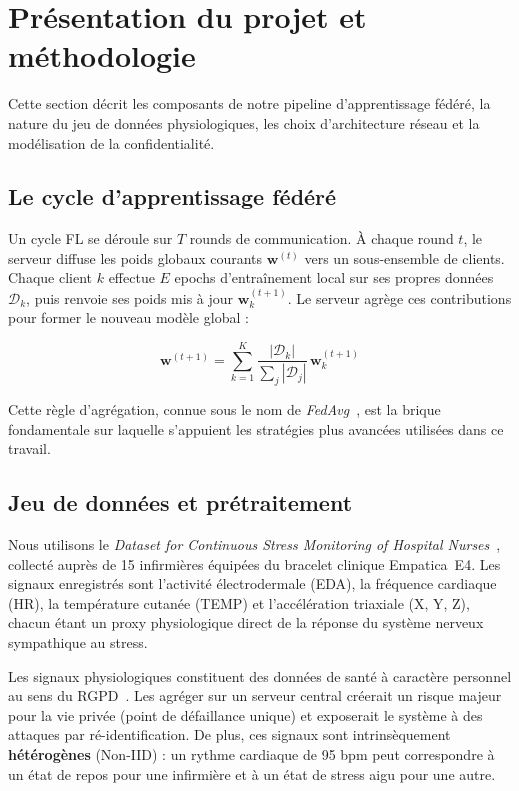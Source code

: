 \documentclass{article}
\begin{document}
\section{Présentation du projet et méthodologie}
\label{sec:methodology}

Cette section décrit les composants de notre pipeline d'apprentissage fédéré, la nature
du jeu de données physiologiques, les choix d'architecture réseau et la modélisation
de la confidentialité.

\subsection{Le cycle d'apprentissage fédéré}
\label{subsec:fl_cycle}

Un cycle FL se déroule sur $T$ rounds de communication. À chaque round $t$, le serveur
diffuse les poids globaux courants $\mathbf{w}^{(t)}$ vers un sous-ensemble de clients.
Chaque client $k$ effectue $E$ epochs d'entraînement local sur ses propres données
$\mathcal{D}_k$, puis renvoie ses poids mis à jour $\mathbf{w}_k^{(t+1)}$. Le serveur
agrège ces contributions pour former le nouveau modèle global :

\begin{equation}
  \mathbf{w}^{(t+1)} = \sum_{k=1}^{K} \frac{|\mathcal{D}_k|}{\sum_j |\mathcal{D}_j|}
  \, \mathbf{w}_k^{(t+1)}
  \label{eq:fedavg}
\end{equation}

Cette règle d'agrégation, connue sous le nom de \textit{FedAvg}~\cite{mcmahan2017communication},
est la brique fondamentale sur laquelle s'appuient les stratégies plus avancées
utilisées dans ce travail.

\subsection{Jeu de données et prétraitement}
\label{subsec:dataset}

Nous utilisons le \textit{Dataset for Continuous Stress Monitoring of Hospital
Nurses}~\cite{nurse_stress_dataset}, collecté auprès de 15 infirmières équipées du
bracelet clinique Empatica~E4. Les signaux enregistrés sont l'activité électrodermale
(EDA), la fréquence cardiaque (HR), la température cutanée (TEMP) et l'accélération
triaxiale (X, Y, Z), chacun étant un proxy physiologique direct de la réponse du
système nerveux sympathique au stress.

Les signaux physiologiques constituent des données de santé à caractère personnel au
sens du RGPD~\cite{gdpr2016}. Les agréger sur un serveur central créerait un risque
majeur pour la vie privée (point de défaillance unique) et exposerait le système à
des attaques par ré-identification. De plus, ces signaux sont intrinsèquement
\textbf{hétérogènes} (Non-IID) : un rythme cardiaque de 95 bpm peut correspondre à
un état de repos pour une infirmière et à un état de stress aigu pour une autre.
\end{document}
